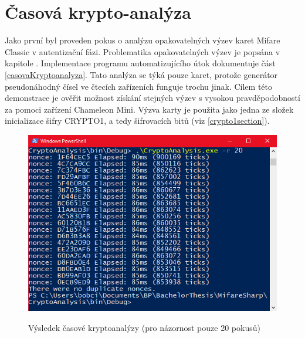 \section{Časová krypto-analýza}
\label{vyhodnoceniKryptoAnalyza}
Jako první byl proveden pokus o analýzu opakovatelných výzev karet Mifare Classic v autentizační fázi. Problematika opakovatelných výzev je popsána v kapitole . Implementace programu automatizujícího útok dokumentuje část \ref{casovaKryptoanalyza}. Tato analýza se týká pouze karet, protože generátor pseudonáhodný čísel ve čtecích zařízeních funguje trochu jinak. Cílem této demonstrace je ověřit možnost získání stejných výzev s vysokou pravděpodobností za pomoci zařízení Chameleon Mini. Výzva karty je použita jako jedna ze složek inicializace šifry CRYPTO1, a tedy šifrovacích bitů (viz \ref{crypto1section}). \par

\begin{figure}[ht]\centering
  \centering
  \includegraphics[width=\linewidth]{obrazky-figures/obrazekKryptoanalyza.png}\\[1pt]  
  \caption{Výsledek časové kryptoanalýzy (pro názornost pouze 20 pokusů)}    
  \label{obrazekKryptoanalyza}
\end{figure}

